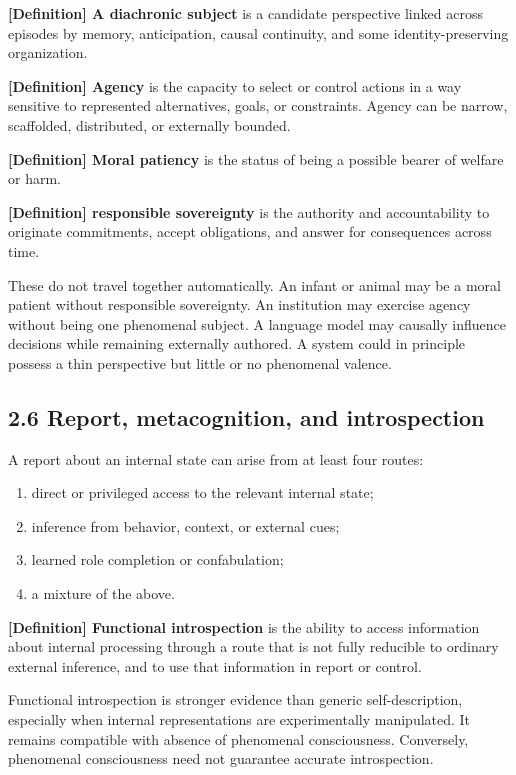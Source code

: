 \documentclass[
  11pt,
]{article}
\providecommand{\tightlist}{%
  \setlength{\itemsep}{0pt}\setlength{\parskip}{0pt}}
\begin{document}
\textbf{{[}Definition{]} A diachronic subject} is a candidate
perspective linked across episodes by memory, anticipation, causal
continuity, and some identity-preserving organization.

\textbf{{[}Definition{]} Agency} is the capacity to select or control
actions in a way sensitive to represented alternatives, goals, or
constraints. Agency can be narrow, scaffolded, distributed, or
externally bounded.

\textbf{{[}Definition{]} Moral patiency} is the status of being a
possible bearer of welfare or harm.

\textbf{{[}Definition{]} responsible sovereignty} is the authority and
accountability to originate commitments, accept obligations, and answer
for consequences across time.

These do not travel together automatically. An infant or animal may be a
moral patient without responsible sovereignty. An institution may
exercise agency without being one phenomenal subject. A language model
may causally influence decisions while remaining externally authored. A
system could in principle possess a thin perspective but little or no
phenomenal valence.

\subsection{2.6 Report, metacognition, and
introspection}\label{report-metacognition-and-introspection}

A report about an internal state can arise from at least four routes:

\begin{enumerate}
\def\labelenumi{\arabic{enumi}.}
\tightlist
\item
  direct or privileged access to the relevant internal state;
\item
  inference from behavior, context, or external cues;
\item
  learned role completion or confabulation;
\item
  a mixture of the above.
\end{enumerate}

\textbf{{[}Definition{]} Functional introspection} is the ability to
access information about internal processing through a route that is not
fully reducible to ordinary external inference, and to use that
information in report or control.

Functional introspection is stronger evidence than generic
self-description, especially when internal representations are
experimentally manipulated. It remains compatible with absence of
phenomenal consciousness. Conversely, phenomenal consciousness need not
guarantee accurate introspection.
\end{document}
